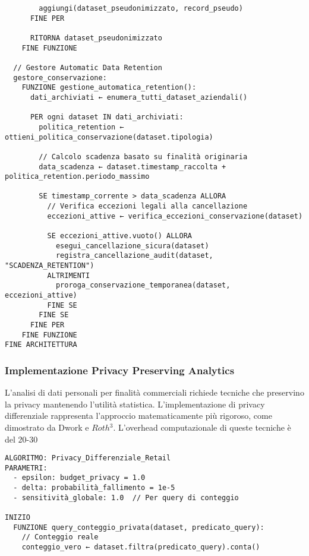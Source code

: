 {\begin{verbatim}
        aggiungi(dataset_pseudonimizzato, record_pseudo)
      FINE PER
      
      RITORNA dataset_pseudonimizzato
    FINE FUNZIONE

  // Gestore Automatic Data Retention
  gestore_conservazione:
    FUNZIONE gestione_automatica_retention():
      dati_archiviati ← enumera_tutti_dataset_aziendali()
      
      PER ogni dataset IN dati_archiviati:
        politica_retention ← ottieni_politica_conservazione(dataset.tipologia)
        
        // Calcolo scadenza basato su finalità originaria
        data_scadenza ← dataset.timestamp_raccolta + politica_retention.periodo_massimo
        
        SE timestamp_corrente > data_scadenza ALLORA
          // Verifica eccezioni legali alla cancellazione
          eccezioni_attive ← verifica_eccezioni_conservazione(dataset)
          
          SE eccezioni_attive.vuoto() ALLORA
            esegui_cancellazione_sicura(dataset)
            registra_cancellazione_audit(dataset, "SCADENZA_RETENTION")
          ALTRIMENTI
            proroga_conservazione_temporanea(dataset, eccezioni_attive)
          FINE SE
        FINE SE
      FINE PER
    FINE FUNZIONE
FINE ARCHITETTURA
\end{verbatim}

\subsubsection{Implementazione Privacy Preserving Analytics}

L'analisi di dati personali per finalità commerciali richiede tecniche che preservino la privacy mantenendo l'utilità statistica. L'implementazione di privacy differenziale rappresenta l'approccio matematicamente più rigoroso, come dimostrato da Dwork e $Roth$$^{3}$. L'overhead computazionale di queste tecniche è del 20-30%

\begin{verbatim}
ALGORITMO: Privacy_Differenziale_Retail
PARAMETRI:
  - epsilon: budget_privacy = 1.0
  - delta: probabilità_fallimento = 1e-5
  - sensitività_globale: 1.0  // Per query di conteggio

INIZIO
  FUNZIONE query_conteggio_privata(dataset, predicato_query):
    // Conteggio reale
    conteggio_vero ← dataset.filtra(predicato_query).conta()
    

\end{verbatim}}
